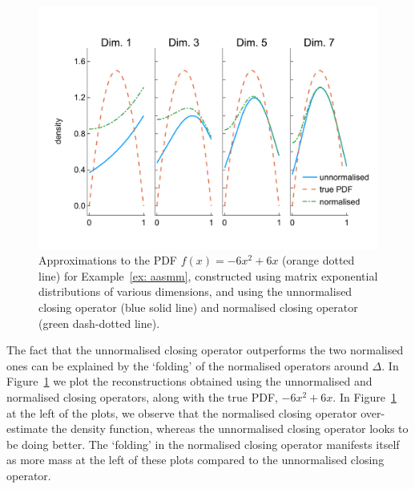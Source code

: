 \begin{example}
	\begin{figure}[h]
		\centering
		\includegraphics[width=\textwidth,trim={0cm 1.25cm 0cm 1.25cm},clip]{chapter6/figs/qbdrap_closing_vec/fun6/pdfs_formatted.pdf}
		\caption{Approximations to the PDF \(f(x)=-6x^2+6x\) (orange dotted line) for Example~\ref{ex: aasmm}, constructed using matrix exponential distributions of various dimensions, and using the unnormalised closing operator (blue solid line) and normalised closing operator (green dash-dotted line).} 
		\label{fig: pdf reconstructed quadratic}
	\end{figure} 
The fact that the unnormalised closing operator outperforms the two normalised ones can be explained by the `folding' of the normalised operators around \(\Delta\). In Figure~\ref{fig: pdf reconstructed quadratic} we plot the reconstructions obtained using the unnormalised and normalised closing operators, along with the true PDF, \(-6x^2+6x\). In Figure~\ref{fig: pdf reconstructed quadratic} at the left of the plots, we observe that the normalised closing operator over-estimate the density function, whereas the unnormalised closing operator looks to be doing better. The `folding' in the normalised closing operator manifests itself as more mass at the left of these plots compared to the unnormalised closing operator. 
\end{example}

